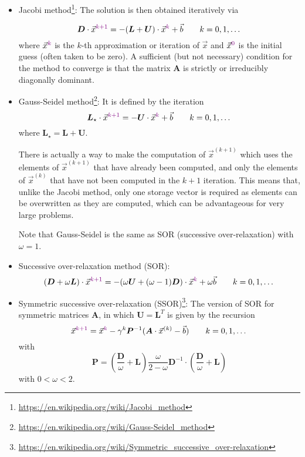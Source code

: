 \begin{itemize}
\item Jacobi method\footnote{\url{https://en.wikipedia.org/wiki/Jacobi_method}}: 
The solution is then obtained iteratively via

\begin{equation}
{\bm D} \cdot \vec{x}^{{\color{violet}k+1}} = -({\bm L} + {\bm U}) \cdot \vec{x}^{\color{violet}k} 
+ \vec{b}
\qquad k=0,1,\dots
\end{equation}
where 
$\vec{x}^{\color{violet}k}$ is the $k$-th approximation or iteration of $\vec{x}$ and
$\vec{x}^{\color{violet}0}$ is the initial guess (often taken to be zero).
A sufficient (but not necessary) condition for the method to converge is that the matrix ${\bm A}$ 
is strictly or irreducibly diagonally dominant.

\item Gauss-Seidel method\footnote{\url{https://en.wikipedia.org/wiki/Gauss-Seidel_method}}: 
It is defined by the iteration
\begin{equation}
{\bm L_\star} \cdot \vec{x}^{{\color{violet}k+1}} = - {\bm U} \cdot \vec{x}^{\color{violet}k} 
+ \vec{b}
\qquad k=0,1,\dots
\end{equation}
where ${\bm L}_\star = {\bm L}+{\bm U}$.

There is actually a way to make the computation of $\vec{x}^{(k+1)}$ which uses the elements of 
$\vec{x}^{(k+1)}$ that have already been computed, and only the elements of $\vec{x}^{(k)}$ that 
have not been computed in the $k+1$ iteration. 
This means that, unlike the Jacobi method, only one storage vector is required as elements 
can be overwritten as they are computed, which can be advantageous for very large problems. 

Note that Gauss-Seidel is the same as SOR (successive over-relaxation) with $\omega = 1$.

\item Successive over-relaxation method (SOR):
\begin{equation}
({\bm D} + \omega {\bm L}) \cdot \vec{x}^{{\color{violet}k+1}} 
= - (\omega{\bm U} + (\omega-1) {\bm D}) \cdot \vec{x}^{\color{violet}k} 
+ \omega \vec{b}
\qquad k=0,1,\dots
\end{equation}


\item Symmetric successive over-relaxation 
(SSOR)\footnote{\url{https://en.wikipedia.org/wiki/Symmetric_successive_over-relaxation}}:
The version of SOR for symmetric matrices ${\bm A}$, in which ${\bm U}={\bm L}^T$ is 
given by the recursion
\begin{equation}
\vec{x}^{{\color{violet}k+1}} 
=  \vec{x}^{\color{violet}k} 
-\gamma^k {\bm P}^{-1} ( {\bm A}\cdot \vec{x}^{(k)} -\vec{b})
\qquad k=0,1,\dots
\end{equation}
with 
\[
{\bm P} = \left(\frac{\bm D}{\omega}+{\bm L}\right) \frac{\omega}{2-\omega} {\bm D}^{-1}\cdot
\left(\frac{\bm D}{\omega}+ {\bm L} \right)
\]
with $0<\omega<2$.



\end{itemize}

